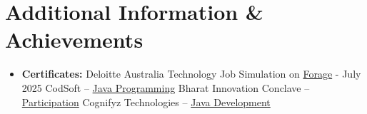 \documentclass[a4paper,10pt]{article}
\begin{document}
\section{Additional Information \& Achievements}
\begin{itemize}[nosep,after=\strut, leftmargin=1em, itemsep=0pt,label=--]
\item \textbf{Certificates:} Deloitte Australia Technology Job Simulation on \href{https://drive.google.com/file/d/1dP-lXbwKe-u69BI3Z1gX4FDZZyn8Cr5n/view}{Forage} - July 2025 \textbar{} CodSoft -- \href{https://drive.google.com/file/d/1TeMMQSghHzaITFT6s5T-Z1C5Xvn22QMs/view}{Java Programming} \textbar{} Bharat Innovation Conclave -- \href{https://drive.google.com/file/d/11uL40HfYTX029SwxAb8JDQUY9_X5_uaO/view?usp=drive_link}{Participation} \textbar{} Cognifyz Technologies -- \href{https://drive.google.com/file/d/1eQty7zGGwGZ_mdupwpvc1sC22R4D-R7X/view}{Java Development}
\end{itemize}
\end{document}

